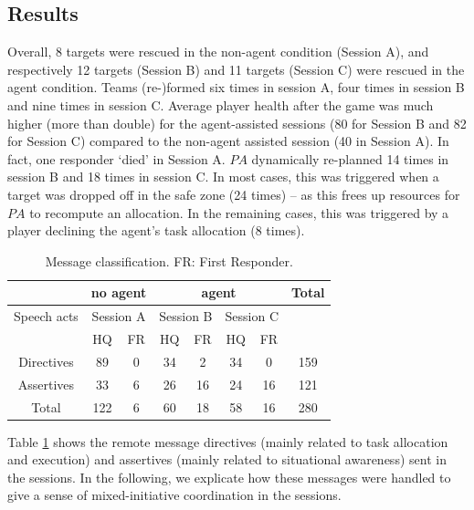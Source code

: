 \subsection{Results}
\noindent Overall, 8 targets were rescued in the non-agent condition (Session A), and respectively 12 targets (Session B) and 11 targets (Session C) were rescued in the agent condition. Teams (re-)formed six times in session A, four times in session B and nine times  in session C. Average player health after the game was much higher (more than double) for the agent-assisted sessions (80 for Session B and 82 for Session C) compared to the non-agent assisted session (40 in Session A). In fact, one responder `died' in Session A.
$PA$ dynamically re-planned 14 times in session B and 18 times in session C. In most cases, this was triggered when a target was dropped off in the safe zone (24 times) -- as this frees up resources for  $PA$ to recompute an allocation. In the remaining cases, this was triggered by a player declining the agent's task allocation (8 times). \vspace{-3mm}



\begin{table}[ht]\small\centering
\begin{tabular}{c | c c | c c c c | c}
 & \multicolumn{2}{c|}{no agent} &  \multicolumn{4}{c|}{agent} & Total \\
 \hline
 Speech acts & \multicolumn{2}{c|}{Session A} & \multicolumn{2}{c}{Session B} & \multicolumn{2}{c|}{Session C} & \\
  & HQ & FR & HQ & FR & HQ & FR & \\
  \hline
  Directives & 89 & 0 & 34 & 2 & 34 & 0 & 159 \\
  Assertives & 33 & 6 & 26 & 16 & 24 & 16 & 121 \\
  \hline
  Total & 122 & 6 & 60 & 18 & 58 & 16 & 280 \\
\end{tabular}
\vspace{-2mm}
 \caption{Message classification. FR: First Responder.} \label{tab:msgs}
\end{table}

Table \ref{tab:msgs} shows the remote message directives (mainly related to task allocation and execution) and assertives (mainly related to situational awareness) sent in the sessions. In the following, we explicate how these messages were handled to give a sense of mixed-initiative coordination in the sessions.


